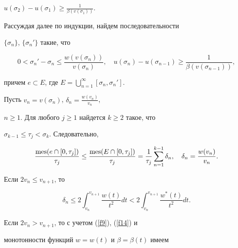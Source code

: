 $u(\sigma_{2})-u(\sigma_{1})\geq\frac{1}{\beta(v(\sigma_{1}))}$.


Рассуждая далее по индукции, найдем последовательности


$\{\sigma_{n}\}$, $\{\sigma_{n}'\}$ такие, что


\begin{equation}\label{f14}


0<\sigma_{n}'-\sigma_{n}\leq\frac{w(v(\sigma_{n}))}{v(\sigma_{n})},\quad


u(\sigma_{n})-u(\sigma_{n-1})\geq\frac{1}{\beta(v(\sigma_{n-1}))},


\end{equation}


причем $e\subset E$, где $E=\bigcup\limits_{n=1}^{\infty}


[\sigma_{n},\sigma_{n}']$.





Пусть $v_{n}=v(\sigma_{n})$, $\delta_{n}=\frac{w(v_{n})}{v_{n}}$,


$n\geq 1$. Для любого $j\geq 1$ найдется $k\geq 2$ такое, что


$\sigma_{k-1}\leq\tau_{j}< \sigma_{k}$. Следовательно,


\begin{equation}\label{f15}


\frac{\mes(e\cap[0,\tau_{j}])}{\tau_{j}}\leq


\frac{\mes(E\cap[0,\tau_{j}])}{\tau_{j}}=


\frac{1}{\tau_{j}}\sum_{n=1}^{k-1}\delta_{n},\quad


\delta_{n}=\frac{w(v_{n})}{v_{n}}.


\end{equation}





Если $2v_{n}\leq v_{n+1}$, то


\begin{equation}\label{f16}


\delta_{n}\leq 2\int_{v_{n}}^{v_{n+1}}\frac{w(t)}{t^{2}}dt<


2\int_{v_{n}}^{v_{n+1}}\frac{w^{*}(t)}{t^{2}}dt.


\end{equation}





Если $2v_{n}>v_{n+1}$, то с учетом (\ref{f9}), (\ref{f14}) и


монотонности функций $w=w(t)$ и $\beta=\beta(t)$ имеем 


